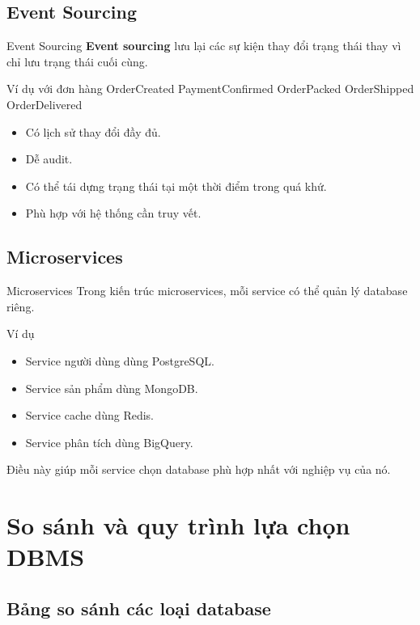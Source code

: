 \documentclass[aspectratio=169,11pt]{beamer}
\newcommand{\keyword}[1]{\textcolor{accent}{\textbf{#1}}}
\newcommand{\kw}[1]{\keyword{#1}}
\newcommand{\smallitem}{\setlength{\itemsep}{2pt}\setlength{\parskip}{0pt}}
\begin{document}
\subsection{Event Sourcing}
\begin{frame}{Event Sourcing}
\kw{Event sourcing} lưu lại các sự kiện thay đổi trạng thái thay vì chỉ lưu trạng thái cuối cùng.

\begin{block}{Ví dụ với đơn hàng}
\ttfamily OrderCreated \quad PaymentConfirmed \quad OrderPacked \quad OrderShipped \quad OrderDelivered
\end{block}

\begin{itemize}
  \smallitem
  \item Có lịch sử thay đổi đầy đủ.
  \item Dễ audit.
  \item Có thể tái dựng trạng thái tại một thời điểm trong quá khứ.
  \item Phù hợp với hệ thống cần truy vết.
\end{itemize}
\end{frame}

\subsection{Microservices}
\begin{frame}{Microservices}
Trong kiến trúc microservices, mỗi service có thể quản lý database riêng.

\begin{exampleblock}{Ví dụ}
\begin{itemize}
  \smallitem
  \item Service người dùng dùng PostgreSQL.
  \item Service sản phẩm dùng MongoDB.
  \item Service cache dùng Redis.
  \item Service phân tích dùng BigQuery.
\end{itemize}
\end{exampleblock}

Điều này giúp mỗi service chọn database phù hợp nhất với nghiệp vụ của nó.
\end{frame}

\section{So sánh và quy trình lựa chọn DBMS}
\subsection{Bảng so sánh các loại database}
\end{document}
